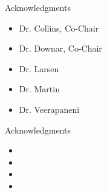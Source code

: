 
\begin{frame}[t]{Acknowledgments}
    
    \begin{itemize}
        \item Dr. Collins, Co-Chair
        \item Dr. Downar, Co-Chair
        \item Dr. Larsen
        \item Dr. Martin
        \item Dr. Veerapaneni
    \end{itemize}
    
\end{frame}


\begin{frame}[t]{Acknowledgments}
\footnotesize
\begin{itemize}
    \item 
    \item 
    \item 
    \item 
\end{itemize}

\end{frame}
